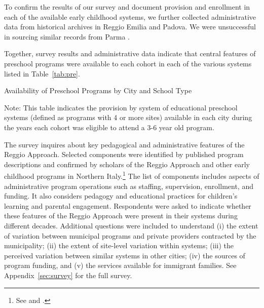 To confirm the results of our survey and document provision and enrollment in each of the available early childhood systems, we further collected administrative data from historical archives in Reggio Emilia and Padova. We were unsuccessful in sourcing similar records from Parma \citep{Padova-Admin-Data_1964-2011,Reggio-Admin-data_1966-2006,Reggio-Annual-Journals_1994-2011}.

Together, survey results and administrative data indicate that central features of preschool programs were available to each cohort in each of the various systems listed in Table~\ref{tab:pre}.

\begin{table}[H]
\centering
\caption{Availability of Preschool Programs by City and School Type}\label{tab:pre}
\begin{adjustbox}{width=\textwidth}
\begin{threeparttable}
	
\begin{tablenotes}
Note: This table indicates the provision by system of educational preschool systems (defined as programs with 4 or more sites) available in each city during the years each cohort was eligible to attend a 3-6 year old program.
\end{tablenotes}
\end{threeparttable}
\end{adjustbox}
\end{table}

The survey inquires about key pedagogical and administrative features of the Reggio Approach. Selected components were identified by published program descriptions and confirmed by scholars of the Reggio Approach and other early childhood programs in Northern Italy.\footnote{See \citet{Edwards-etal-eds_1998_Hundred-Languages} and \citet{Corsaro_2008_Policy-Practice}.} The list of components includes aspects of administrative program operations such as staffing, supervision, enrollment, and funding. It also considers pedagogy and educational practices for children's learning and parental engagement. Respondents were asked to indicate whether these features of the Reggio Approach were present in their systems during different decades. Additional questions were included to understand (i) the extent of variation between municipal programs and private providers contracted by the municipality; (ii) the extent of site-level variation within systems; (iii) the perceived variation between similar systems in other cities; (iv) the sources of program funding, and (v) the services available for immigrant families. See Appendix~\ref{sec:survey} for the full survey.

